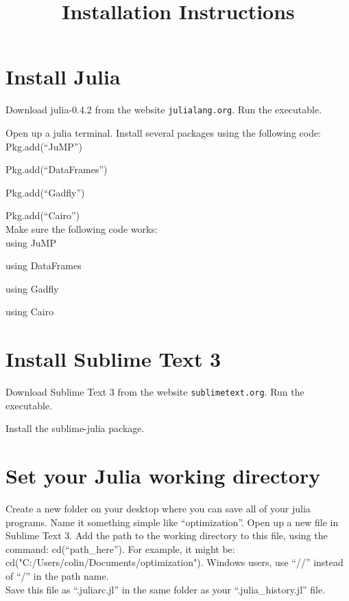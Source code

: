 \documentclass[12pt]{article}
\begin{document}
\title{Installation Instructions}

\maketitle

\section{Install Julia}

Download julia-0.4.2 from the website \texttt{julialang.org}.  Run the executable.  

Open up a julia terminal.  Install several packages using the following code:\\

Pkg.add(``JuMP'')

Pkg.add(``DataFrames'')

Pkg.add(``Gadfly'')

Pkg.add(``Cairo'')\\

Make sure the following code works:\\

using JuMP

using DataFrames

using Gadfly

using Cairo

\section{Install Sublime Text 3}

Download Sublime Text 3 from the website \texttt{sublimetext.org}.  Run the executable.

Install the sublime-julia package.  

\section{Set your Julia working directory}

Create a new folder on your desktop where you can save all of your julia programs.  Name it something simple like ``optimization''.  Open up a new file in Sublime Text 3.  Add the path to the working directory to this file, using the command: cd(``path\_here'').  For example, it might be: cd("C:/Users/colin/Documents/optimization").  Windows users, use ``//'' instead of ``/'' in the path name.  \\

Save this file as ``.juliarc.jl'' in the same folder as your ``.julia\_history.jl'' file.  
\end{document}
